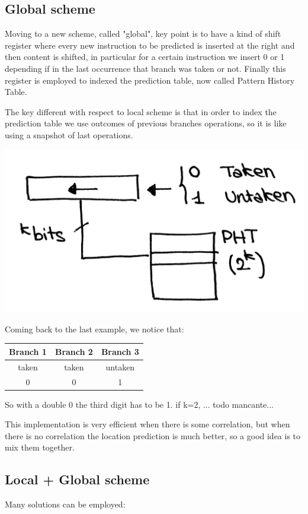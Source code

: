 \subsection{Global scheme}

Moving to a new scheme, called "global", key point is to have a kind of shift register where every new instruction to be predicted is inserted at the right and then content is shifted, in particular for a certain instruction we insert 0 or 1 depending if in the last occurrence that branch was taken or not. Finally this register is employed to indexed the prediction table, now called Pattern History Table.

The key different with respect to local scheme is that in order to index the prediction table we use outcomes of previous branches operations, so it is like using a snapshot of last operations.

\begin{center}
  \includegraphics[width=0.6\linewidth]{img/img3/19}
\end{center}

Coming back to the last example, we notice that:

\begin{center}
  \begin{tabular}{|c|c|c|}
    \hline
    Branch 1&   Branch 2&   Branch 3\\
    \hline
    taken&      taken&      untaken\\
    0&          0&      1\\
    \hline
  \end{tabular}
\end{center}

So with a double 0 the third digit has to be 1. if k=2, ... todo mancante...

This implementation is very efficient when there is some correlation, but when there is no correlation the location prediction is much better, so a good idea is to mix them together.

\subsection{Local + Global scheme}
Many solutions can be employed:

